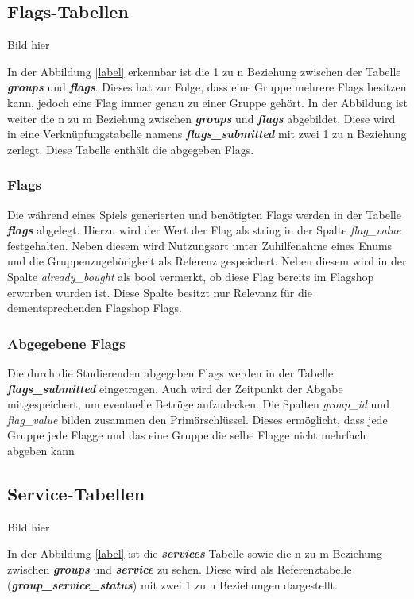 \subsection{Flags-Tabellen}
Bild hier

In der Abbildung \ref{label} erkennbar ist die 1 zu n Beziehung zwischen der Tabelle \textbf{\textit{groups}} und \textbf{\textit{flags}}. Dieses hat zur Folge, dass eine Gruppe mehrere Flags besitzen kann, jedoch eine Flag immer genau zu einer Gruppe gehört. In der Abbildung ist weiter die n zu m Beziehung zwischen \textbf{\textit{groups}} und \textbf{\textit{flags}} abgebildet. Diese wird in eine Verknüpfungstabelle namens \textbf{\textit{flags\_submitted}} mit zwei 1 zu n Beziehung zerlegt. Diese Tabelle enthält die abgegeben Flags.
 
\subsubsection{Flags}
Die während eines Spiels generierten und benötigten Flags werden in der Tabelle \textbf{\textit{flags}} abgelegt. Hierzu wird der Wert der Flag als string in der Spalte \textit{flag\_value} festgehalten. Neben diesem wird Nutzungsart unter Zuhilfenahme eines Enums und die Gruppenzugehörigkeit als Referenz gespeichert. Neben diesem wird in der Spalte \textit{already\_bought} als bool vermerkt, ob diese Flag bereits im Flagshop erworben wurden ist. Diese Spalte besitzt nur Relevanz für die dementsprechenden Flagshop Flags.

\subsubsection{Abgegebene Flags}
Die durch die Studierenden abgegeben Flags werden in der Tabelle \textbf{\textit{flags\_submitted}} eingetragen. Auch wird der Zeitpunkt der Abgabe mitgespeichert, um eventuelle Betrüge aufzudecken. Die Spalten \textit{group\_id} und \textit{flag\_value} bilden zusammen den Primärschlüssel. Dieses ermöglicht, dass jede Gruppe jede Flagge und das eine Gruppe die selbe Flagge nicht mehrfach abgeben kann

\subsection{Service-Tabellen}
Bild hier

In der Abbildung \ref{label} ist die \textbf{\textit{services}} Tabelle sowie die n zu m Beziehung zwischen \textbf{\textit{groups}} und \textbf{\textit{service}} zu sehen. Diese wird als Referenztabelle (\textbf{\textit{group\_service\_status}}) mit zwei 1 zu n Beziehungen dargestellt.

